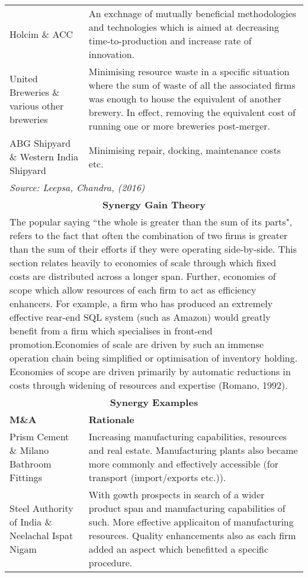 \documentclass[11pt, english]{article}
\begin{document}
\begin{center}
\begin{longtable}{p{5cm}p{7.5cm}}
        Holcim \& ACC & An exchnage of mutually beneficial methodologies and technologies which is aimed at decreasing time-to-production and increase rate of innovation.\\ 
        United Breweries \& various other breweries & Minimising resource waste in a specific situation where the sum of waste of all the associated firms was enough to house the equivalent of another brewery. In effect, removing the equivalent cost of running one or more breweries post-merger.\\
        ABG Shipyard \& Western India Shipyard & Minimising repair, docking, maintenance costs etc.\\
	\hline
        \multicolumn{2}{p{13cm}}{\textit{Source: Leepsa, Chandra, (2016)}}\\
        \hline
        \hline
        \multicolumn{2}{c}{\textbf{Synergy Gain Theory}}\\
        \hline
        \hline
        \multicolumn{2}{p{13cm}}{The popular saying ``the whole is greater than the sum of its parts", refers to the fact that often the combination of two firms is greater than the sum of their efforts if they were operating side-by-side. This section relates heavily to economies of scale  through which fixed costs are distributed across a longer span. Further, economies of scope which allow resources of each firm to act as efficiency enhancers. For example, a firm who has produced an extremely effective rear-end SQL system (such as Amazon) would greatly benefit from a firm which specialises in front-end promotion.\newline\newline Economies of scale are driven by such an immense operation chain being simplified or optimisation of inventory holding. Economies of scope are driven primarily by automatic reductions in costs through widening of resources and expertise (Romano, 1992).}\\
        \hline
        \multicolumn{2}{c}{\textbf{Synergy Examples}}\\
        \hline
        \textbf{M\&A} & \textbf{Rationale}\\
        \hline
        Prism Cement \& Milano Bathroom Fittings & Increasing manufacturing capabilities, resources and real estate. Manufacturing plants also became more commonly and effectively accessible (for transport (import/exports etc.)).\\
        Steel Authority of India \& Neelachal Ispat Nigam & With gowth prospects in search of a wider product span and manufacturing capabilities of such. More effective applicaiton of manufacturing resources. Quality enhancements also as each firm added an aspect which benefitted a specific procedure.\\

\end{longtable}
\end{center}
\end{document}
